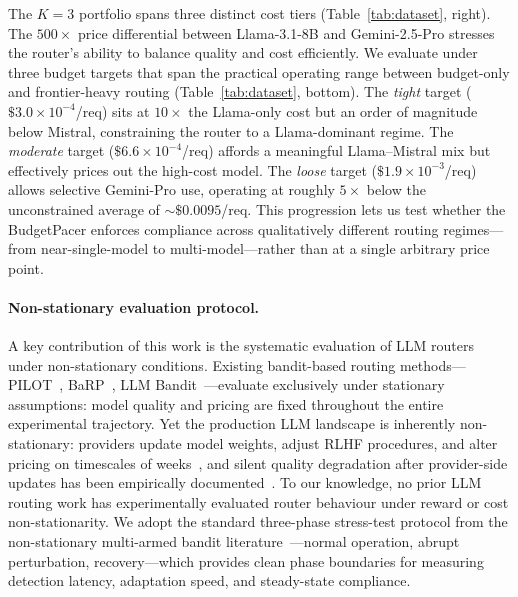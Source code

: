 The $K{=}3$ portfolio spans three distinct cost tiers (Table~\ref{tab:dataset}, right).  The $500\times$ price differential between Llama-3.1-8B and Gemini-2.5-Pro stresses the router's ability to balance quality and cost efficiently.
We evaluate under three budget targets that span the practical operating range between budget-only and frontier-heavy routing (Table~\ref{tab:dataset}, bottom).
The \emph{tight} target ($\$3.0{\times}10^{-4}$/req) sits at $10\times$ the Llama-only cost but an order of magnitude below Mistral, constraining the router to a Llama-dominant regime.
The \emph{moderate} target ($\$6.6{\times}10^{-4}$/req) affords a meaningful Llama--Mistral mix but effectively prices out the high-cost model.
The \emph{loose} target ($\$1.9{\times}10^{-3}$/req) allows selective Gemini-Pro use, operating at roughly $5\times$ below the unconstrained average of ${\sim}\$0.0095$/req.
This progression lets us test whether the BudgetPacer enforces compliance across qualitatively different routing regimes---from near-single-model to multi-model---rather than at a single arbitrary price point.

\paragraph{Non-stationary evaluation protocol.}
A key contribution of this work is the systematic evaluation of LLM routers under non-stationary conditions.
Existing bandit-based routing methods---PILOT~\cite{panda2025pilot}, BaRP~\cite{wang2025barp}, LLM Bandit~\cite{li2025llmbandit}---evaluate exclusively under stationary assumptions: model quality and pricing are fixed throughout the entire experimental trajectory.
Yet the production LLM landscape is inherently non-stationary: providers update model weights, adjust RLHF procedures, and alter pricing on timescales of weeks~\cite{chen2023chatgptdrift}, and silent quality degradation after provider-side updates has been empirically documented~\cite{chen2025silent}.
To our knowledge, no prior LLM routing work has experimentally evaluated router behaviour under reward or cost non-stationarity.
We adopt the standard three-phase stress-test protocol from the non-stationary multi-armed bandit literature~\cite{garivier2011switching}---normal operation, abrupt perturbation, recovery---which provides clean phase boundaries for measuring detection latency, adaptation speed, and steady-state compliance.

